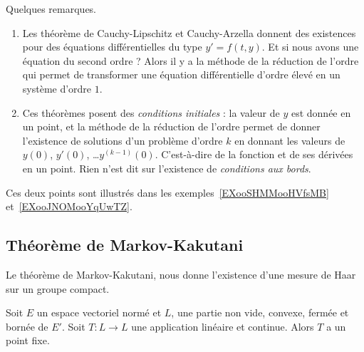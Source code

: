 \begin{remark}
	Quelques remarques.
	\begin{enumerate}
		\item
		      Les théorème de Cauchy-Lipschitz et Cauchy-Arzella donnent des existences pour des équations différentielles du type \( y'=f(t,y)\). Et si nous avons une équation du second ordre ? Alors il y a la méthode de la réduction de l'ordre qui permet de transformer une équation différentielle d'ordre élevé en un système d'ordre \( 1\).
		\item
		      Ces théorèmes posent des \emph{conditions initiales} : la valeur de \( y\) est donnée en un point, et la méthode de la réduction de l'ordre permet de donner l'existence de solutions d'un problème d'ordre \( k\) en donnant les valeurs de \( y(0)\), \( y'(0)\), \ldots \( y^{(k-1)}(0)\). C'est-à-dire de la fonction et de ses dérivées en un point. Rien n'est dit sur l'existence de \emph{conditions aux bords}.
	\end{enumerate}
	Ces deux points sont illustrés dans les exemples~\ref{EXooSHMMooHVfsMB} et~\ref{EXooJNOMooYqUwTZ}.
\end{remark}

\subsection{Théorème de Markov-Kakutani}

Le théorème de Markov-Kakutani, nous donne l'existence d'une mesure de Haar sur un groupe compact.

\begin{theorem}   \label{ThoeJCdMP}
	Soit \( E\) un espace vectoriel normé et \( L\), une partie non vide, convexe, fermée et bornée de \( E'\). Soit \( T\colon L\to L\) une application linéaire et continue. Alors \( T\) a un point fixe.
\end{theorem}

